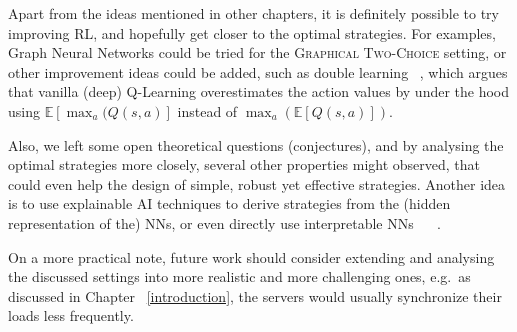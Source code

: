 Apart from the ideas mentioned in other chapters, it is definitely possible to try improving RL, and hopefully get closer to the optimal strategies. For examples, Graph Neural Networks could be tried for the \textsc{Graphical Two-Choice} setting, or other improvement ideas could be added, such as double learning ~\cite{hasselt2010doubleqlearning}, which argues that vanilla (deep) Q-Learning overestimates the action values by under the hood using $\mathbb{E}[\max_a(Q(s,a)]$ instead of $\max_a(\mathbb{E}[Q(s,a)])$.


Also, we left some open theoretical questions (conjectures), and by analysing the optimal strategies more closely, several other properties might observed, that could even help the design of simple, robust yet effective strategies. Another idea is to use explainable AI techniques to derive strategies from the (hidden representation of the) NNs, or even directly use interpretable NNs ~\cite{vacareanu2022explainableAI1} ~\cite{tang2022explainableAI2}.

On a more practical note, future work should consider extending and analysing the discussed settings into more realistic and more challenging ones, e.g.\ as discussed in Chapter ~\ref{introduction}, the servers would usually synchronize their loads less frequently. 